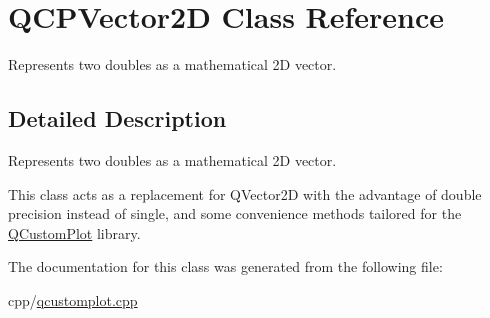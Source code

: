 \hypertarget{class_q_c_p_vector2_d}{}\section{Q\+C\+P\+Vector2D Class Reference}
\label{class_q_c_p_vector2_d}


Represents two doubles as a mathematical 2D vector.  




\subsection{Detailed Description}
Represents two doubles as a mathematical 2D vector. 

This class acts as a replacement for Q\+Vector2D with the advantage of double precision instead of single, and some convenience methods tailored for the \mbox{\hyperlink{class_q_custom_plot}{Q\+Custom\+Plot}} library. 

The documentation for this class was generated from the following file\+:\begin{DoxyCompactItemize}
\item 
cpp/\mbox{\hyperlink{qcustomplot_8cpp}{qcustomplot.\+cpp}}\end{DoxyCompactItemize}
